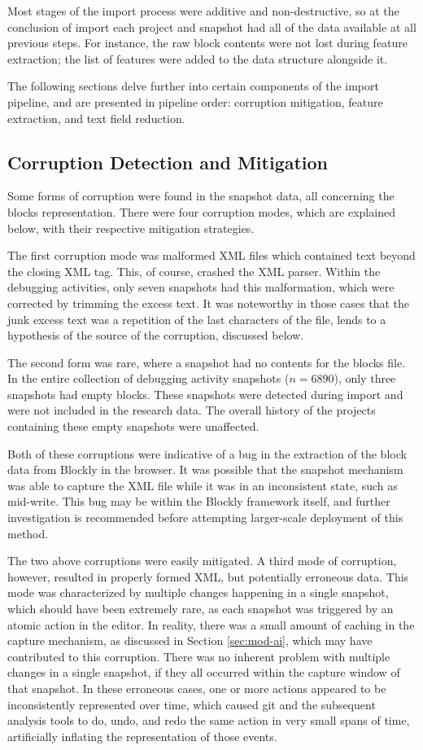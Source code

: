 Most stages of the import process were additive and non-destructive, so at the conclusion of import each project and snapshot had all of the data available at all previous steps. For instance, the raw block contents were not lost during feature extraction; the list of features were added to the data structure alongside it. 

The following sections delve further into certain components of the import pipeline, and are presented in pipeline order: corruption mitigation, feature extraction, and text field reduction.


\subsection{Corruption Detection and Mitigation}
Some forms of corruption were found in the snapshot data, all concerning the blocks representation. There were four corruption modes, which are explained below, with their respective mitigation strategies.

The first corruption mode was malformed XML files which contained text beyond the closing XML tag. This, of course, crashed the XML parser. Within the debugging activities, only seven snapshots had this malformation, which were corrected by trimming the excess text. It was noteworthy in those cases that the junk excess text was a repetition of the last characters of the file, lends to a hypothesis of the source of the corruption, discussed below.

The second form was rare, where a snapshot had no contents for the blocks file. In the entire collection of debugging activity snapshots ($n = 6890$), only three snapshots had empty blocks. These snapshots were detected during import and were not included in the research data. The overall history of the projects containing these empty snapshots were unaffected. 

Both of these corruptions were indicative of a bug in the extraction of the block data from Blockly in the browser. It was possible that the snapshot mechanism was able to capture the XML file while it was in an inconsistent state, such as mid-write. This bug may be within the Blockly framework itself, and further investigation is recommended before attempting larger-scale deployment of this method.

The two above corruptions were easily mitigated. A third mode of corruption, however, resulted in properly formed XML, but potentially erroneous data. This mode was characterized by multiple changes happening in a single snapshot, which should have been extremely rare, as each snapshot was triggered by an atomic action in the editor. In reality, there was a small amount of caching in the capture mechanism, as discussed in Section \ref{sec:mod-ai}, which may have contributed to this corruption. There was no inherent problem with multiple changes in a single snapshot, if they all occurred within the capture window of that snapshot. In these erroneous cases, one or more actions appeared to be inconsistently represented over time, which caused git and the subsequent analysis tools to do, undo, and redo the same action in very small spans of time, artificially inflating the representation of those events. 

